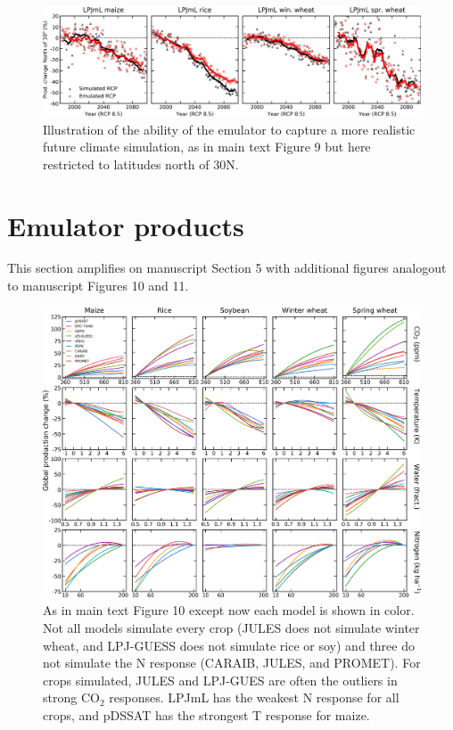 \documentclass[12pt]{article}
\begin{document}
\begin{figure}[h!]
  \centering
  \includegraphics[width = 16.3cm]{LPJMLRCP85comp_30N.png}
  \caption{
  Illustration of the ability of the emulator to capture a more realistic future climate simulation, as in main text Figure 9 but here restricted to latitudes north of 30N.}
  \label{fig:lpjmlrcp}
\end{figure}

\clearpage
\section{Emulator products}
\begin{flushleft}
This section amplifies on manuscript Section 5 with additional figures analogout to manuscript Figures 10 and 11. 
\end{flushleft}

\vspace{0.3in}

\begin{figure}[h!]
  \centering
  \includegraphics[width = 16.3cm]{em_CTWN_all_crops_color.png}
  \caption{
	  As in main text Figure 10 except now each model is shown in color. Not all models simulate every crop (JULES does not simulate winter wheat, and LPJ-GUESS does not simulate rice or soy) and three do not simulate the N response (CARAIB, JULES, and PROMET). For crops simulated, JULES and LPJ-GUES are often the outliers in strong CO$_2$ responses. LPJmL has the weakest N response for all crops, and pDSSAT has the strongest T response for maize.  
  }
  \label{fig:all_dims}
\end{figure}
\end{document}
